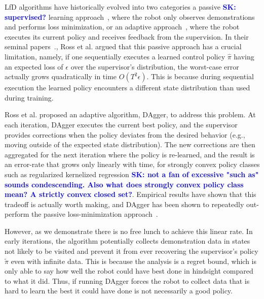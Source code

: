 \documentclass[10pt, conference]{ieeeconf}      %
\newcommand{\sknote}[1]{%
 {\textcolor{blue}{\textbf{SK: #1}}}{}}
\begin{document}
LfD algorithms have historically evolved into two categories a passive \sknote{supervised?} learning approach~\cite{pomerleau1989alvinn}, where the robot only observes demonstrations and performs loss minimization, or an adaptive approach~\cite{ross2010reduction}, where the robot executes its current policy and receives feedback from the supervision. In their seminal papers~\cite{ross2010efficient,ross2010reduction,ross2013learning}., Ross et al. argued that this passive approach has a crucial limitation, namely,  if one sequentially executes a learned control policy $\hat{\pi}$ having an expected loss of $\epsilon$ over the supervisor's distribution, the worst-case error actually grows quadratically in time $O(T^2\epsilon)$. This is because during sequential execution the learned policy encounters a different state distribution than used during training.

Ross et al. proposed an adaptive algorithm, DAgger, to address this problem.  At each iteration, DAgger executes the current best policy, and the supervisor provides corrections when the policy deviates from the desired behavior (e.g., moving outside of the expected state distribution). The new corrections are then aggregated for the next iteration where the policy is re-learned, and the result is an error-rate that grows only linearly with time, for strongly convex policy classes such as regularized kernelized regression \sknote{not a fan of excessive "such as" sounds condescending. Also what does strongly convex policy class mean? A strictly convex closed set?}. Empirical results have shown that this tradeoff is actually worth making,  and DAgger has been shown to repeatedly out-perform the passive loss-minimization approach~\cite{ross2010efficient,ross2010reduction,ross2013learning}.

However, as we demonstrate there is no free lunch to achieve this linear rate. In early iterations, the algorithm potentially collects demonstration data in states not likely to be visited and prevent it from ever  recovering the supervisor's policy $\tilde{\pi}$ even with infinite data. This is because the analysis is a regret bound, which is only able to say how well the robot could have best done in hindsight compared to what it did. Thus, if running DAgger forces the robot to collect data that is hard to learn the best it could have done is not necessarily a good policy. 
\end{document}
